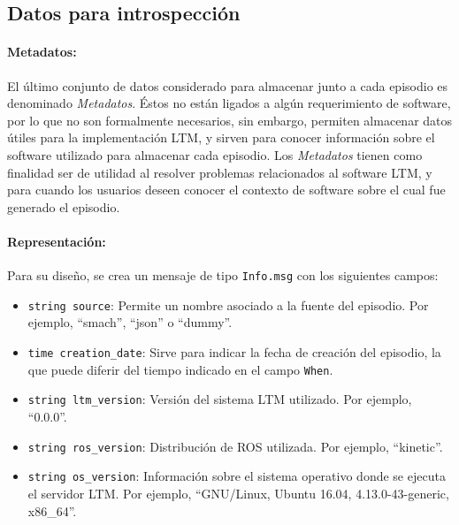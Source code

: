 \subsection{Datos para introspección}

\paragraph{Metadatos:}
El último conjunto de datos considerado para almacenar junto a cada episodio es denominado \textit{Metadatos}. Éstos no están ligados a algún requerimiento de software, por lo que no son formalmente necesarios, sin embargo, permiten almacenar datos útiles para la implementación LTM, y sirven para conocer información sobre el software utilizado para almacenar cada episodio. Los \textit{Metadatos} tienen como finalidad ser de utilidad al resolver problemas relacionados al software LTM, y para cuando los usuarios deseen conocer el contexto de software sobre el cual fue generado el episodio.

\paragraph{Representación:}
Para su diseño, se crea un mensaje de tipo \texttt{Info.msg} con los siguientes campos:
\begin{itemize}
\item \texttt{string source}: Permite un nombre asociado a la fuente del episodio. Por ejemplo, ``smach'', ``json'' o ``dummy''.
\item \texttt{time creation\_date}: Sirve para indicar la fecha de creación del episodio, la que puede diferir del tiempo indicado en el campo \texttt{When}.
\item \texttt{string ltm\_version}: Versión del sistema LTM utilizado. Por ejemplo, ``0.0.0''.
\item \texttt{string ros\_version}: Distribución de ROS utilizada. Por ejemplo, ``kinetic''.
\item \texttt{string os\_version}: Información sobre el sistema operativo donde se ejecuta el servidor LTM. Por ejemplo, ``GNU/Linux, Ubuntu 16.04, 4.13.0-43-generic, x86\_64''.
\end{itemize}

